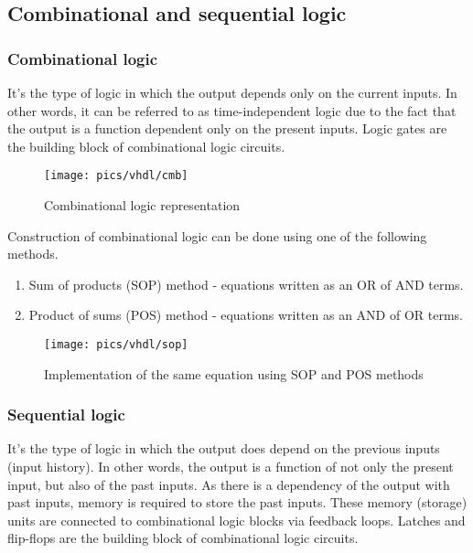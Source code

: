 \subsection{Combinational and sequential logic}

\subsubsection{Combinational logic}

It's the type of logic in which the output depends only on the current inputs. In other words, it can be referred to as time-independent logic due to the fact that the output is a function dependent only on the present inputs. Logic gates are the building block of combinational logic circuits.

\begin{figure}[!h]
	\centering
	\texttt{[image: pics/vhdl/cmb]}
	\caption{Combinational logic representation}
	\label{fig:cmb}
\end{figure}
 
\noindent
Construction of combinational logic can be done using one of the following methods.
\begin{enumerate}
	\item Sum of products (SOP) method - equations written as an OR of AND terms.
	\item Product of sums (POS) method - equations written as an AND of OR terms.	
\end{enumerate}

\begin{figure}[!h]
	\centering
	\texttt{[image: pics/vhdl/sop]}
	\caption{Implementation of the same equation using SOP and POS methods}
	\label{fig:sop}
\end{figure}

\subsubsection{Sequential logic}

It's the type of logic in which the output does depend on the previous inputs (input  history). In other words, the output is a function of not only the present input, but also of the past inputs. As there is a dependency of the output with past inputs, memory is required to store the past inputs. These memory (storage) units are connected to combinational logic blocks via feedback loops. Latches and flip-flops are the building block of combinational logic circuits.

